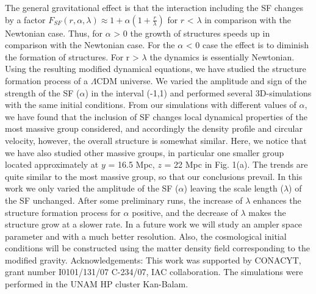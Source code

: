 \documentclass[10pt,journal]{IEEEtran}
\begin{document}
The general gravitational effect is that the interaction
including the SF changes by a factor $F_{SF}(r,\alpha,\lambda) \approx1+\alpha(1+\frac{r}{\lambda})$ for $r$ < $\lambda$ in comparison with the Newtonian case. Thus, for $\alpha$ > 0 the growth of structures speeds up
in comparison with the Newtonian case. For the $\alpha$ < 0
case the effect is to diminish the formation of structures.
For r > $\lambda$ the dynamics is essentially Newtonian. \newline
Using the resulting modified dynamical equations, we
have studied the structure formation process of a $\Lambda$CDM
universe. We varied the amplitude and sign of the
strength of the SF ($\alpha$) in the interval (-1,1) and performed several 3D-simulations with the same initial conditions. From our simulations with different values of $\alpha$,
we have found that the inclusion of SF changes local dynamical properties of the most massive group considered,
and accordingly the density profile and circular velocity,
however, the overall structure is somewhat similar. Here,
we notice that we have also studied other massive groups,
in particular one smaller group located approximately at
$y$ = 16.5 Mpc, $z$ = 22 Mpc in Fig. 1(a). The trends
are quite similar to the most massive group, so that our
conclusions prevail.
In this work we only varied the amplitude of the SF
($\alpha$) leaving the scale length ($\lambda$) of the SF unchanged.
After some preliminary runs, the increase of $\lambda$ enhances
the structure formation process for $\alpha$ positive, and the decrease of $\lambda$ makes the structure grow at a slower rate. \newline
In a future work we will study an ampler space parameter
and with a much better resolution. Also, the cosmological initial conditions will be constructed using the matter
density field corresponding to the modified gravity. \newline
\newline\newline\newline\newline\newline\newline
Acknowledgements: This work was supported by
CONACYT, grant number I0101/131/07 C-234/07, IAC
collaboration. The simulations were performed in the
UNAM HP cluster Kan-Balam.

\printbibliography[title={BIBLIOGRAPHY}]
\end{document}
